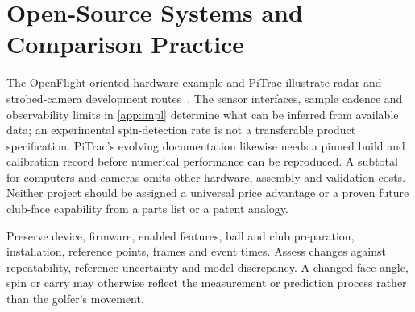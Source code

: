 \section{Open-Source Systems and Comparison Practice}

The OpenFlight-oriented hardware example and PiTrac illustrate radar and strobed-camera development routes~\cite{an029,pitrac}.
The sensor interfaces, sample cadence and observability limits in \cref{app:impl} determine what can be inferred from available data; an experimental spin-detection rate is not a transferable product specification.
PiTrac's evolving documentation likewise needs a pinned build and calibration record before numerical performance can be reproduced.
A subtotal for computers and cameras omits other hardware, assembly and validation costs.
Neither project should be assigned a universal price advantage or a proven future club-face capability from a parts list or a patent analogy.

\begin{implication}
Preserve device, firmware, enabled features, ball and club preparation, installation, reference points, frames and event times.
Assess changes against repeatability, reference uncertainty and model discrepancy.
A changed face angle, spin or carry may otherwise reflect the measurement or prediction process rather than the golfer's movement.
\end{implication}

